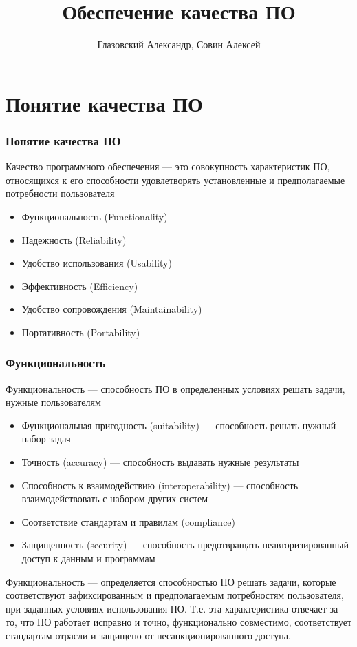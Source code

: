 \documentclass{../industrial-development}
\title{Обеспечение качества ПО}
\author{Глазовский Александр, Совин Алексей}
\date{}
\begin{document}
	
	\begin{frame}
		\titlepage
	\end{frame}
	
	
	
	\section{Понятие качества ПО}
	\begin{frame} \frametitle{Понятие качества ПО}
		\begin{block}{}
			\alert{Качество программного обеспечения} --- это совокупность характеристик ПО, относящихся к его способности удовлетворять установленные и предполагаемые потребности пользователя
		\end{block}
		\begin{itemize}
			\item Функциональность (Functionality)
			\item Надежность (Reliability)
			\item Удобство использования (Usability)
			\item Эффективность (Efficiency)
			\item Удобство сопровождения (Maintainability)
			\item Портативность (Portability)
		\end{itemize}
	\end{frame}
	
	\begin{frame} \frametitle {Функциональность}
		\begin{block}{}
			\alert{Функциональность} --- способность ПО в определенных условиях решать задачи, нужные пользователям
		\end{block}
		\begin{itemize}
			\item Функциональная пригодность (suitability) --- способность решать нужный набор задач
			\item Точность (accuracy) --- способность выдавать нужные результаты
			\item Способность к взаимодействию (interoperability) --- способность взаимодействовать с набором других систем
			\item Соответствие стандартам и правилам (compliance)
			\item Защищенность (security) --- способность предотвращать неавторизированный доступ к данным и программам
		\end{itemize}
	\end{frame}
	\lecturenotes Функциональность --- определяется способностью ПО решать задачи, которые соответствуют зафиксированным и предполагаемым потребностям пользователя, при заданных условиях использования ПО. Т.е. эта характеристика отвечает за то, что ПО работает исправно и точно, функционально совместимо, соответствует стандартам отрасли и защищено от несанкционированного доступа.
	
\end{document}
